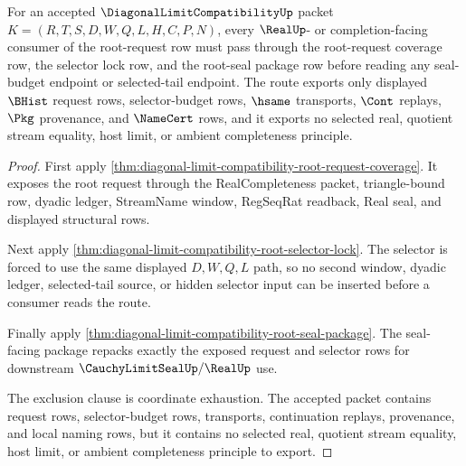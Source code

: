 \begin{theorem}
\label{thm:diagonal-limit-compatibility-root-request-selector-exhaustion}
For an accepted $\DiagonalLimitCompatibilityUp$ packet $K=(R,T,S,D,W,Q,L,H,C,P,N)$, every $\RealUp$- or completion-facing consumer of the root-request row must pass through the root-request coverage row, the selector lock row, and the root-seal package row before reading any seal-budget endpoint or selected-tail endpoint. The route exports only displayed $\BHist$ request rows, selector-budget rows, $\hsame$ transports, $\Cont$ replays, $\Pkg$ provenance, and $\NameCert$ rows, and it exports no selected real, quotient stream equality, host limit, or ambient completeness principle.
\end{theorem}
\begin{proof}
First apply \autoref{thm:diagonal-limit-compatibility-root-request-coverage}. It exposes the root request through the RealCompleteness packet, triangle-bound row, dyadic ledger, StreamName window, RegSeqRat readback, Real seal, and displayed structural rows.

Next apply \autoref{thm:diagonal-limit-compatibility-root-selector-lock}. The selector is forced to use the same displayed $D,W,Q,L$ path, so no second window, dyadic ledger, selected-tail source, or hidden selector input can be inserted before a consumer reads the route.

Finally apply \autoref{thm:diagonal-limit-compatibility-root-seal-package}. The seal-facing package repacks exactly the exposed request and selector rows for downstream $\CauchyLimitSealUp/\RealUp$ use.

The exclusion clause is coordinate exhaustion. The accepted packet contains request rows, selector-budget rows, transports, continuation replays, provenance, and local naming rows, but it contains no selected real, quotient stream equality, host limit, or ambient completeness principle to export.
\end{proof}
